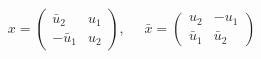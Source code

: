 \begin{equation}
x=\left(
\begin{array}{cc}
\bar{u}_{2}  & u_{1} \\
-\bar{u}_{1}  & u_{2}
\end{array}
\right),~~~~~~\bar{x} = \left(
\begin{array}{cc}
u_{2}  & -u_{1} \\
\bar{u}_{1}  & \bar{u}_{2}
\end{array}
\right)
\end{equation}

